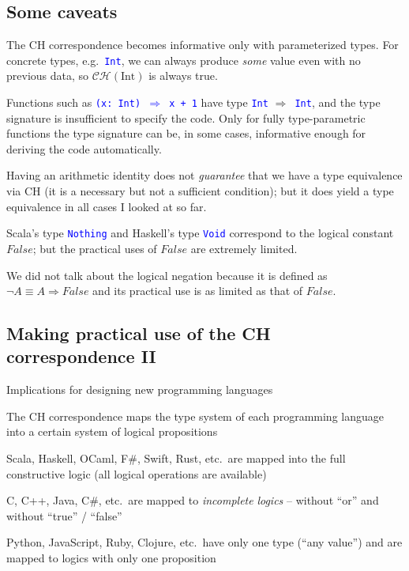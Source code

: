 \subsection{Some caveats}

The CH correspondence becomes informative only with parameterized
types. For concrete types, e.g.\ \texttt{\textcolor{blue}{\footnotesize{}Int}},
we can always produce \emph{some} value even with no previous data,
so $\mathcal{CH}(\text{Int})$ is always true.

Functions such as \texttt{\textcolor{blue}{\footnotesize{}(x:\ Int)
$\Rightarrow$ x + 1}} have type \texttt{\textcolor{blue}{\footnotesize{}Int}}
$\Rightarrow$\texttt{\textcolor{blue}{\footnotesize{} Int}}, and
the type signature is insufficient to specify the code. Only for fully
type-parametric functions the type signature can be, in some cases,
informative enough for deriving the code automatically.

Having an arithmetic identity does not \emph{guarantee} that we have
a type equivalence via CH (it is a necessary but not a sufficient
condition); but it does yield a type equivalence in all cases I looked
at so far.

Scala's type \texttt{\textcolor{blue}{\footnotesize{}Nothing}} and
Haskell's type \texttt{\textcolor{blue}{\footnotesize{}Void}} correspond
to the logical constant $False$; but the practical uses of $False$
are extremely limited. 

We did not talk about the logical negation because it is defined as
$\neg A\equiv A\Rightarrow False$ and its practical use is as limited
as that of $False$.

\subsection{Making practical use of the CH correspondence II}

Implications for designing new programming languages

The CH correspondence maps the type system of each programming language
into a certain system of logical propositions 

Scala, Haskell, OCaml, F\#, Swift, Rust, etc.~are mapped into the
full constructive logic (all logical operations are available)

C, C++, Java, C\#, etc.~are mapped to \emph{incomplete} \emph{logics}
– without ``or'' and without ``true'' / ``false''

Python, JavaScript, Ruby, Clojure, etc.~have only one type (``any
value'') and are mapped to logics with only one proposition

